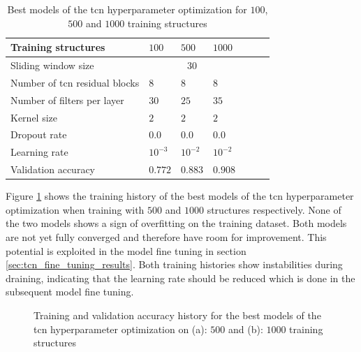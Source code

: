 \documentclass[conference]{IEEEtran}
\begin{document}
\begin{table}[htp]
	\centering
	\caption{Best models of the \gls{tcn} hyperparameter optimization for $ 100 $, $ 500 $ and $ 1000 $ training structures}
	\label{tab:hyperparameters_100_500_1000_structures_TCN}
	\begin{tabular}{p{2.5cm}|llllll}
		Training structures & $ 100 $ & $ 500 $ & $ 1000 $ \\
		\hline
		Sliding window size & \multicolumn{3}{c}{$ 30 $} \\
		\hline
		Number of \gls{tcn} residual blocks & $ 8 $ & $ 8 $ & $ 8 $ \\
		Number of filters per layer & $ 30 $ & $ 25 $ & $ 35 $ \\
		Kernel size & $ 2 $ & $ 2 $ & $ 2 $ \\
		Dropout rate & $ 0.0 $ & $ 0.0 $ & $ 0.0 $ \\
		Learning rate & $ 10^{-3} $ & $ 10^{-2} $ & $ 10^{-2} $ \\
		\hline
		Validation accuracy & $ 0.772 $ & $ 0.883 $ & $ 0.908 $
	\end{tabular}
\end{table}

Figure \ref{fig:accuracy_500_1000_structures_random_search_TCN} shows the training history of the best models of the \gls{tcn} hyperparameter optimization when training with $ 500 $ and $ 1000 $ structures respectively. None of the two models shows a sign of overfitting on the training dataset. Both models are not yet fully converged and therefore have room for improvement. This potential is exploited in the model fine tuning in section \ref{sec:tcn_fine_tuning_results}. Both training histories show instabilities during draining, indicating that the learning rate should be reduced which is done in the subsequent model fine tuning.

\begin{figure}[htp]
	\centering
	\quad
	\caption{Training and validation accuracy history for the best models of the \gls{tcn} hyperparameter optimization on (a): $ 500 $ and (b): $ 1000 $ training structures}
	\label{fig:accuracy_500_1000_structures_random_search_TCN}
\end{figure}
\end{document}
